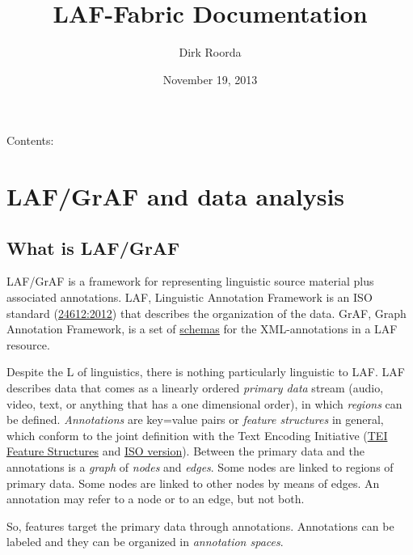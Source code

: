 \documentclass[letterpaper,10pt,english]{sphinxmanual}
\title{LAF-Fabric Documentation}
\date{November 19, 2013}
\author{Dirk Roorda}
\begin{document}
\maketitle
\tableofcontents
{}\label{index::doc}


Contents:


\chapter{LAF/GrAF and data analysis}
\label{overview:laf-graf-and-data-analysis}\label{overview::doc}\label{overview:welcome-to-laf-fabric-s-documentation}

\section{What is LAF/GrAF}
\label{overview:what-is-laf-graf}
LAF/GrAF is a framework for representing linguistic source material plus associated annotations.
LAF, Linguistic Annotation Framework is an
ISO standard (\href{http://www.iso.org/iso/catalogue\_detail.htm?csnumber=37326}{24612:2012})
that describes the organization of the data.
GrAF, Graph Annotation Framework, is a set of
\href{http://www.xces.org/ns/GrAF/1.0/}{schemas} for the XML-annotations in a LAF resource.

Despite the L of linguistics, there is nothing particularly linguistic to LAF.
LAF describes data that comes as a linearly ordered \emph{primary data} stream
(audio, video, text, or anything that has a one dimensional order), in which \emph{regions} can be defined.
\emph{Annotations} are key=value pairs or \emph{feature structures} in general,
which conform to the joint definition with the Text Encoding Initiative
(\href{http://www.tei-c.org/release/doc/tei-p5-doc/en/html/FS.html}{TEI Feature Structures}
and \href{http://www.iso.org/iso/catalogue\_detail.htm?csnumber=37324}{ISO version}).
Between the primary data and the annotations is a \emph{graph} of \emph{nodes} and \emph{edges}.
Some nodes are linked to regions of primary data.
Some nodes are linked to other nodes by means of edges.
An annotation may refer to a node or to an edge, but not both.

So, features target the primary data through annotations.
Annotations can be labeled and they can be organized in \emph{annotation spaces}.
\end{document}
